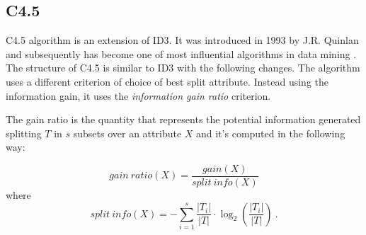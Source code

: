 \documentclass[12pt]{article}
\begin{document}
\subsection{C4.5}
C4.5 \cite{C4.5} algorithm is an extension of ID3. It was introduced in 1993 by J.R. Quinlan and subsequently has become one of most influential algorithms in data mining \cite{top10algorithms}.
%
%
%
The structure of C4.5 is similar to ID3 with the following changes.
The algorithm uses a different criterion of choice of best split attribute.
Instead using the information gain, it uses the \emph{information gain ratio} criterion.

The gain ratio is the quantity that represents the potential information generated splitting $T$ in $s$ subsets over an attribute $X$ and it's computed in the following way:

\begin{equation*}
    gain\ ratio(X) = \frac{gain(X)}{split\ info(X)}
\end{equation*}
where
\begin{equation*}
    split\ info(X) = - \sum_{i=1}^s \frac{|T_i|}{|T|} \cdot \log_2 \left(\frac{|T_i|}{|T|} \right) \ .
\end{equation*}
\end{document}
